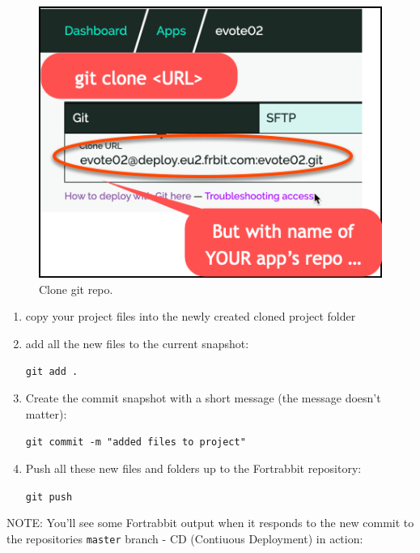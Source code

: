 \documentclass[a4paperpaper,openright]{book}
\begin{document}
\begin{figure}
\centering
\includegraphics{./tex2pdf.-05a85d9d563be472/c51a23adeab67e7c05dc8b5e9068b31e59612313.png}
\caption{Clone git repo.\label{cloneLocal}}
\end{figure}

\begin{enumerate}
\def\labelenumi{\arabic{enumi}.}
\item
  copy your project files into the newly created cloned project folder
\item
  add all the new files to the current snapshot:

  \texttt{git\ add\ .}
\item
  Create the commit snapshot with a short message (the message doesn't
  matter):

  \texttt{git\ commit\ -m\ "added\ files\ to\ project"}
\item
  Push all these new files and folders up to the Fortrabbit repository:

  \texttt{git\ push}
\end{enumerate}

NOTE: You'll see some Fortrabbit output when it responds to the new
commit to the repositories \texttt{master} branch - CD (Contiuous
Deployment) in action:
\end{document}
